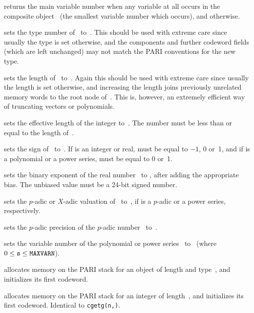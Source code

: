  returns the main variable number when any variable
at all occurs in the composite object~ (the smallest variable number
which occurs), and  otherwise.

 sets the type number of~ to~.
This should be used with extreme care since usually the type is set
otherwise, and the components and further codeword fields (which are left
unchanged) may not match the PARI conventions for the new type.

 sets the length of~ to~. Again
this should be used with extreme care since usually the length is set
otherwise, and increasing the length joins previously unrelated memory words
to the root node of~. This is, however, an extremely efficient way of
truncating vectors or polynomials.

 sets the effective length
of the integer  to~. The number  must be less than or
equal to the length of~.

 sets the sign of~ to~.
If  is an integer or real,  must be equal to $-1$, 0 or~1,
and if  is a polynomial or a power series,  must be equal to
0 or~1.

 sets the binary exponent of the real
number~ to , after adding the appropriate bias. The unbiased
value  must be a 24-bit signed number.

 sets the $p$-adic or $X$-adic valuation
of~ to~, if  is a $p$-adic or a power series,
respectively.

 sets the $p$-adic precision of the
$p$-adic number~ to~.

 sets the variable number of the polynomial
or power series~ to~ (where $0\le {\tt s}\le{\tt MAXVARN}$).



 allocates memory on the PARI stack for
an object of length  and type~, and initializes its first
codeword.

 allocates memory on the PARI stack for an
integer of length~, and initializes its first codeword. Identical to
{\tt cgetg(n,)}.


